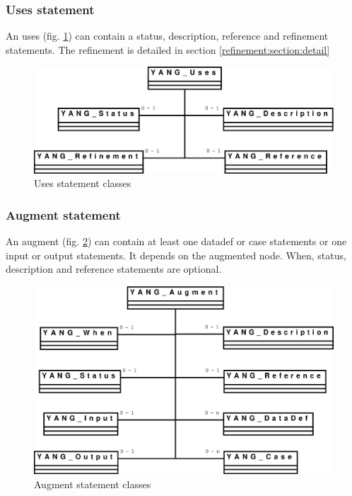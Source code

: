 \documentclass[a4paper]{article}
\begin{document}
\subsubsection{Uses statement}
\label{uses:section:global}

An  uses  (fig. \ref{uses})   can  contain  a  status,  description,
reference and  refinement statements.   The refinement is  detailed in
section \ref{refinement:section:detail}
\begin{figure}[htbp]
\begin{center}
\includegraphics[scale = .3]{uses.eps}
\end{center}
\caption{Uses statement classes}
\label{uses}
\end{figure}

\subsubsection{Augment statement}

An augment  (fig. \ref{augment}) can  contain at least one  datadef or
case statements or  one input or output statements.  It depends on the
augmented node. When, status, description and reference statements are
optional.
\begin{figure}[htbp]
\begin{center}
\includegraphics[scale = .3]{augment.eps}
\end{center}
\caption{Augment statement classes}
\label{augment}
\end{figure}
\end{document}
